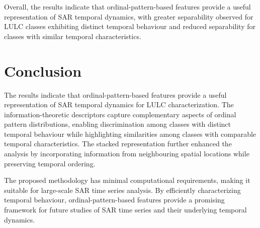 \begin{table}

\caption{\label{tbl-svm-class-performance}SVM classification performance metrics}


\end{table}%

Overall, the results indicate that ordinal-pattern-based features provide a useful representation of SAR temporal dynamics, with greater separability observed for LULC classes exhibiting distinct temporal
behaviour and reduced separability for classes with similar temporal characteristics.

\section{Conclusion}\label{conclusion}

The results indicate that ordinal-pattern-based features provide a useful representation of SAR temporal dynamics for LULC characterization. The information-theoretic descriptors capture complementary aspects of ordinal pattern distributions, enabling discrimination among classes with distinct temporal behaviour while highlighting similarities among classes with comparable temporal characteristics. The stacked representation further enhanced the analysis by incorporating information from neighbouring spatial
locations while preserving temporal ordering.

The proposed methodology has minimal computational requirements, making it suitable for large-scale SAR time series analysis. By efficiently characterizing temporal behaviour, ordinal-pattern-based features
provide a promising framework for future studies of SAR time series and their underlying temporal dynamics.


%
